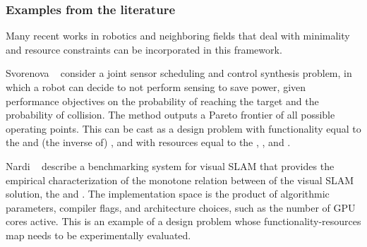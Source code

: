 \begin{example}
\end{example}

\subsubsection*{Examples from the literature}

Many recent works in robotics and neighboring fields that deal with
minimality and resource constraints can be incorporated in this framework.

\begin{example}
Svorenova\,\,\etal~\cite{svorenova16resource} consider a joint
sensor scheduling and control synthesis problem, in which a robot
can decide to not perform sensing to save power, given performance
objectives on the probability of reaching the target and the probability
of collision. The method outputs a Pareto frontier of all possible
operating points. This can be cast as a design problem with functionality
equal to the  and (the inverse
of) , and with resources equal to the
, , and .
 
\end{example}


\begin{example}
Nardi\,\,\etal~\cite{zia16comparative} describe a benchmarking
system for visual SLAM that provides the empirical characterization
of the monotone relation between  of the visual
SLAM solution, the  and . The implementation space is the product
of algorithmic parameters, compiler flags, and architecture choices,
such as the number of GPU cores active. This is an example of a design
problem whose functionality-resources map needs to be experimentally
evaluated.
\end{example}

